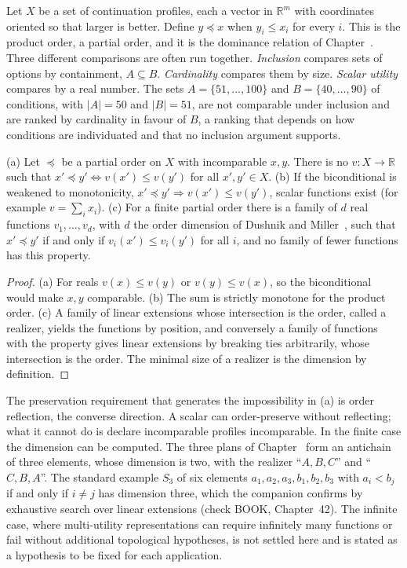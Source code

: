 Let $X$ be a set of continuation profiles, each a vector in $\mathbb R^m$ with coordinates oriented so that larger is better. Define $y\preceq x$ when $y_i\le x_i$ for every $i$. This is the product order, a partial order, and it is the dominance relation of Chapter~. Three different comparisons are often run together. \emph{Inclusion} compares sets of options by containment, $A\subseteq B$. \emph{Cardinality} compares them by size. \emph{Scalar utility} compares by a real number. The sets $A=\{51,\dots,100\}$ and $B=\{40,\dots,90\}$ of conditions, with $|A|=50$ and $|B|=51$, are not comparable under inclusion and are ranked by cardinality in favour of $B$, a ranking that depends on how conditions are individuated and that no inclusion argument supports.

\begin{theorem}\label{thm:P13f}
(a) Let $\preceq$ be a partial order on $X$ with incomparable $x,y$. There is no $v:X\to\mathbb R$ such that $x'\preceq y'\Leftrightarrow v(x')\le v(y')$ for all $x',y'\in X$. (b) If the biconditional is weakened to monotonicity, $x'\preceq y'\Rightarrow v(x')\le v(y')$, scalar functions exist (for example $v=\sum_ix_i$). (c) For a finite partial order there is a family of $d$ real functions $v_1,\dots,v_d$, with $d$ the order dimension of Dushnik and Miller~\cite{dushnik1941}, such that $x'\preceq y'$ if and only if $v_i(x')\le v_i(y')$ for all $i$, and no family of fewer functions has this property.
\end{theorem}

\begin{proof}
(a) For reals $v(x)\le v(y)$ or $v(y)\le v(x)$, so the biconditional would make $x,y$ comparable. (b) The sum is strictly monotone for the product order. (c) A family of linear extensions whose intersection is the order, called a realizer, yields the functions by position, and conversely a family of functions with the property gives linear extensions by breaking ties arbitrarily, whose intersection is the order. The minimal size of a realizer is the dimension by definition.
\end{proof}

The preservation requirement that generates the impossibility in (a) is order reflection, the converse direction. A scalar can order-preserve without reflecting; what it cannot do is declare incomparable profiles incomparable. In the finite case the dimension can be computed. The three plans of Chapter~ form an antichain of three elements, whose dimension is two, with the realizer ``$A,B,C$'' and ``$C,B,A$''. The standard example $S_3$ of six elements $a_1,a_2,a_3,b_1,b_2,b_3$ with $a_i<b_j$ if and only if $i\ne j$ has dimension three, which the companion confirms by exhaustive search over linear extensions (check BOOK, Chapter~42). The infinite case, where multi-utility representations can require infinitely many functions or fail without additional topological hypotheses, is not settled here and is stated as a hypothesis to be fixed for each application.

